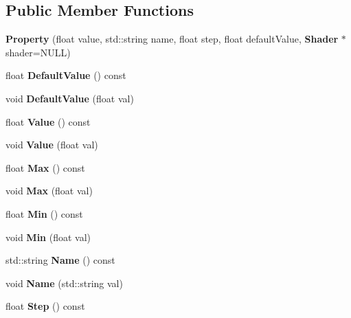 \subsection*{Public Member Functions}
\begin{DoxyCompactItemize}
\item 
{\bfseries Property} (float value, std\-::string name, float step, float default\-Value, {\bf Shader} $\ast$shader=N\-U\-L\-L)\label{classsfs__visualizer_1_1Property_a438d909815621409dbbf1d4591839ae1}

\item 
float {\bfseries Default\-Value} () const \label{classsfs__visualizer_1_1Property_aec431ce75e0047c7ac055a546be758e9}

\item 
void {\bfseries Default\-Value} (float val)\label{classsfs__visualizer_1_1Property_aa76e3a610e0c9cb03e31cbc64310e67c}

\item 
float {\bfseries Value} () const \label{classsfs__visualizer_1_1Property_a71d4855993f1f144f3e19e31d541524c}

\item 
void {\bfseries Value} (float val)\label{classsfs__visualizer_1_1Property_a35ab2d5a595af50d6be37c48c008daa0}

\item 
float {\bfseries Max} () const \label{classsfs__visualizer_1_1Property_aa097088d57b515090065374efd1a5420}

\item 
void {\bfseries Max} (float val)\label{classsfs__visualizer_1_1Property_ace2c6f871b320012fb76831b3cb3afd6}

\item 
float {\bfseries Min} () const \label{classsfs__visualizer_1_1Property_acbd5dbf3f7203857d50f5ff95ae575ee}

\item 
void {\bfseries Min} (float val)\label{classsfs__visualizer_1_1Property_a1077459b26143a72bbaccd34821f3d45}

\item 
std\-::string {\bfseries Name} () const \label{classsfs__visualizer_1_1Property_a0ee3c6cb62b651d697fe2dd441a0506d}

\item 
void {\bfseries Name} (std\-::string val)\label{classsfs__visualizer_1_1Property_aeb9a63ff7b6944d4fe0b65dfc8cc3895}

\item 
float {\bfseries Step} () const \label{classsfs__visualizer_1_1Property_a674f89aee85bf8c24ce5aee71ddb3b4b}


\end{DoxyCompactItemize}
